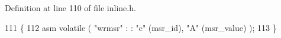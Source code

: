 Definition at line 110 of file inline.\+h.


\begin{DoxyCode}
111 \{
112     \textcolor{keyword}{asm} \textcolor{keyword}{volatile} ( \textcolor{stringliteral}{"wrmsr"} : : \textcolor{stringliteral}{"c"} (msr\_id), \textcolor{stringliteral}{"A"} (msr\_value) );
113 \}
\end{DoxyCode}

